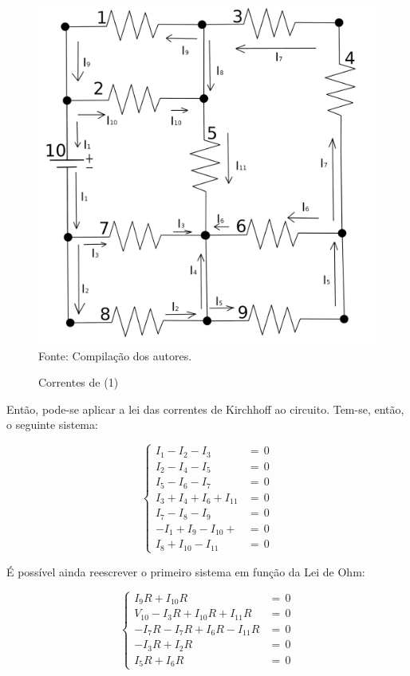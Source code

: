 \documentclass[twocolumn, 10pt]{extarticle}
\begin{document}
\begin{figure}[H]
	\caption{Correntes de (1)} 
	\centering
	\includegraphics[scale=0.43]{circ22}
	\\ Fonte: Compilação dos autores.
\end{figure}

Então, pode-se aplicar a lei das correntes de Kirchhoff ao circuito. Tem-se, então, o seguinte sistema:

\[
\left\{
\begin{aligned}
    I_1 - I_2 - I_3 &= \, 0 \\
    I_2 - I_4 - I_5 &= \, 0 \\
    I_5 - I_6 - I_7 &= \, 0 \\
    I_3 + I_4 + I_6 + I_{11} &= \, 0 \\
    I_7 - I_8 - I_9 &= \, 0 \\
    - I_1 + I_9 - I_{10} + &= \, 0 \\
    I_8 + I_{10} - I_{11} &= \, 0 
\end{aligned}
\right.
\]

É possível ainda reescrever o primeiro sistema em função da Lei de Ohm:

\[
\left\{
\begin{aligned}
    I_9R + I_{10}R &= \,0 \\ 
    V_{10} - I_3R + I_{10}R + I_{11}R &= \,0 \\ 
	-I_7R - I_7R + I_6R - I_{11}R &= \,0 \\
	- I_3R + I_2R &= \,0 \\ 
	I_5R + I_6R &= \,0
\end{aligned}
\right.
\]
\end{document}
